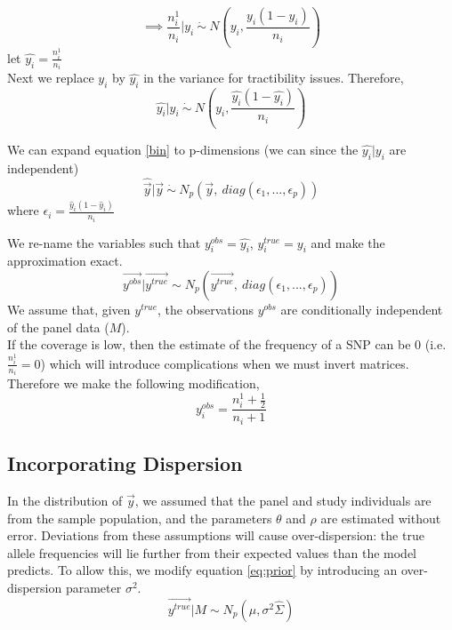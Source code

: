 \documentclass[10pt,a4paper,draft]{article}
\begin{document}
\begin{equation}
\implies \frac{n_i^1}{n_i} | y_i \ \dot{\sim} \ N(y_i, \frac{y_i(1-y_i)}{n_i})
\end{equation}
let $\hat{y_i} = \frac{n_i^1}{n_i}$\\
Next we replace $y_i$ by $\hat{y_i}$ in the variance for tractibility issues. Therefore,
\begin{equation} 
 \hat{y_i} | y_i \ \dot{\sim} \ N(y_i, \frac{\hat{y_i}(1-\hat{y_i})}{n_i}) \label{bin}
\end{equation}

We can expand equation \ref{bin} to p-dimensions (we can since the $\hat{y_i} | y_i$ are independent)
\begin{equation}
\hat{\vec{y}} | \vec{y} \ \dot{\sim} \ N_p(\vec{y}, \ diag(\epsilon_1,...,\epsilon_p)) 
\end{equation}
where $\epsilon_i = \frac{\hat{y}_i (1-\hat{y}_i)}{n_i}$ 

We re-name the variables such that $y_i^{obs} = \hat{y_i}$, $y^{true}_i = y_i$ and make the approximation exact.
\begin{equation}
\vec{y^{obs}} | \vec{y^{true}} \sim  N_p(\vec{y^{true}}, \ diag(\epsilon_1,...,\epsilon_p)) \label{obs_true}
\end{equation}
We assume that, given $y^{true}$, the observations $y^{obs}$ are conditionally independent of the panel data ($M$). \\

If the coverage is low, then the estimate of the frequency of a SNP can be 0 (i.e. $\frac{n_i^1}{n_i}=0$) which will introduce complications when we must invert matrices. Therefore we make the following modification,
\begin{equation}
y_i^{obs} = \frac{n_i^1+\frac{1}{2}}{n_i + 1}
\end{equation} 

\subsection{Incorporating Dispersion}
In the distribution of $\vec{y}$, we assumed that the panel and study individuals are from the sample population, and the parameters $\theta$ and $\rho$ are estimated without error. Deviations from these assumptions will cause over-dispersion: the true allele frequencies will lie further from their expected values than the model predicts. To allow this, we modify equation \ref{eq:prior} by introducing an over-dispersion parameter $\sigma^2$.
\begin{equation}
\vec{y^{true}}|M \sim N_p(\hat{\mu}, \sigma^2\hat{\Sigma})
\end{equation}
\end{document}
